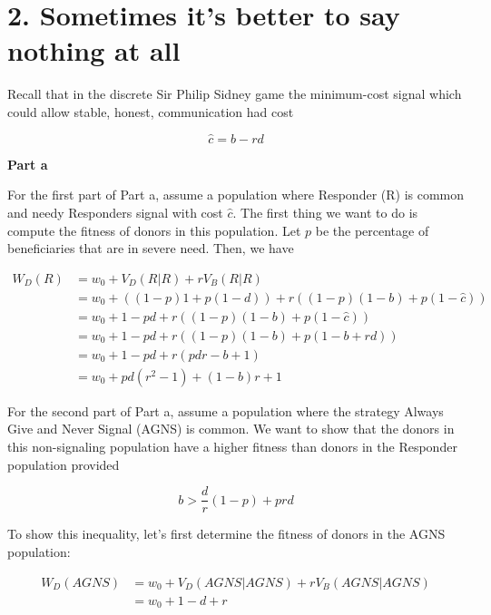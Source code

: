 \documentclass{article}
\begin{document}
\section*{2. Sometimes it's better to say nothing at all}

Recall that in the discrete Sir Philip Sidney game the minimum-cost
signal which could allow stable, honest, communication had cost

\begin{equation*}
    \hat{c} = b - r d
\end{equation*}

\textbf{Part a}

For the first part of Part a, assume a population where Responder (R) is
common and needy Responders signal with cost $\hat{c}$. The first thing
we want to do is compute the fitness of donors in this population. Let
$p$ be the percentage of beneficiaries that are in severe need. Then, we
have

\begin{align*}
    W_D(R) &= w_0 + V_D(R|R) + r V_B(R|R) \\
           &= w_0
              + \left((1 - p) 1 + p (1 - d)\right)
              + r \left((1 - p) (1 - b) + p (1 - \hat{c})\right) \\
           &= w_0 + 1 - p d + r \left((1 - p) (1 - b) + p (1 - \hat{c})\right) \\
           &= w_0 + 1 - p d + r \left((1 - p) (1 - b) + p (1 - b + r d)\right) \\
           &= w_0 + 1 - p d + r \left(p d r - b + 1\right) \\
           &= w_0 + p d (r^2 - 1) + (1 - b) r + 1
\end{align*}

For the second part of Part a, assume a population where the strategy
Always Give and Never Signal (AGNS) is common. We want to show that the
donors in this non-signaling population have a higher fitness than
donors in the Responder population provided

\begin{equation*}
    b > \frac{d}{r} (1 - p) + p r d
\end{equation*}

To show this inequality, let's first determine the fitness of donors in
the AGNS population:

\begin{align*}
    W_D(AGNS) &= w_0 + V_D(AGNS|AGNS) + r V_B(AGNS|AGNS) \\
              &= w_0 + 1 - d + r
\end{align*}
\end{document}
